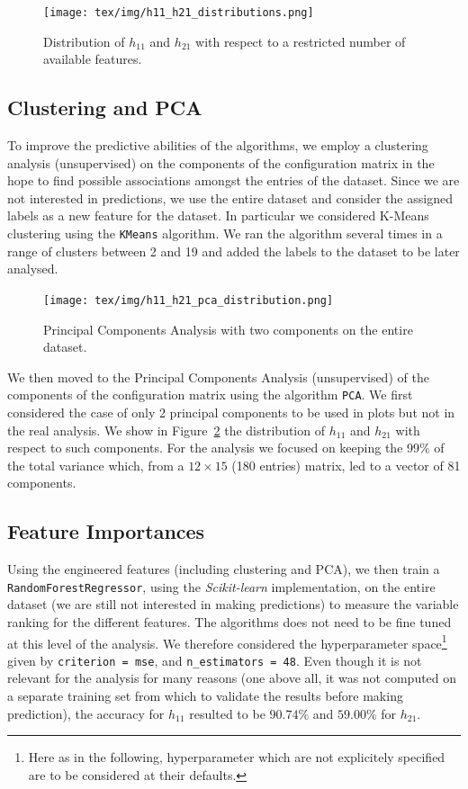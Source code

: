     \begin{figure}[p]
        \centering
        \texttt{[image: tex/img/h11\_h21\_distributions.png]}
        \caption{Distribution of $h_{11}$ and $h_{21}$ with respect to a restricted number of available features.}
        \label{fig:scatter_plot_distributions}
    \end{figure}
    
\subsection{Clustering and PCA}

    To improve the predictive abilities of the algorithms, we employ a clustering analysis (unsupervised) on the components of the configuration matrix in the hope to find possible associations amongst the entries of the dataset. Since we are not interested in predictions, we use the entire dataset and consider the assigned labels as a new feature for the dataset. In particular we considered K-Means clustering using the \texttt{KMeans} algorithm. We ran the algorithm several times in a range of clusters between 2 and 19 and added the labels to the dataset to be later analysed.
    
    \begin{figure}[!t]
        \centering
        \texttt{[image: tex/img/h11\_h21\_pca\_distribution.png]}
        \caption{Principal Components Analysis with two components on the entire dataset.}
        \label{fig:pca_analysis}
    \end{figure}
    
    We then moved to the Principal Components Analysis (unsupervised) of the components of the configuration matrix using the algorithm \texttt{PCA}. We first considered the case of only 2 principal components to be used in plots but not in the real analysis. We show in Figure~\ref{fig:pca_analysis} the distribution of $h_{11}$ and $h_{21}$ with respect to such components. For the analysis we focused on keeping the 99\% of the total variance which, from a $12 \times 15$ (180 entries) matrix, led to a vector of 81 components.
    
\subsection{Feature Importances}

    Using the engineered features (including clustering and PCA), we then train a \texttt{RandomForestRegressor}, using the \textit{Scikit-learn} implementation, on the entire dataset (we are still not interested in making predictions) to measure the variable ranking for the different features. The algorithms does not need to be fine tuned at this level of the analysis. We therefore considered the hyperparameter space\footnote{Here as in the following, hyperparameter which are not explicitely specified are to be considered at their defaults.} given by \texttt{criterion = mse}, and \texttt{n\_estimators = 48}. Even though it is not relevant for the analysis for many reasons (one above all, it was not computed on a separate training set from which to validate the results before making prediction), the accuracy for $h_{11}$ resulted to be $90.74\%$ and $59.00\%$ for $h_{21}$.
    
